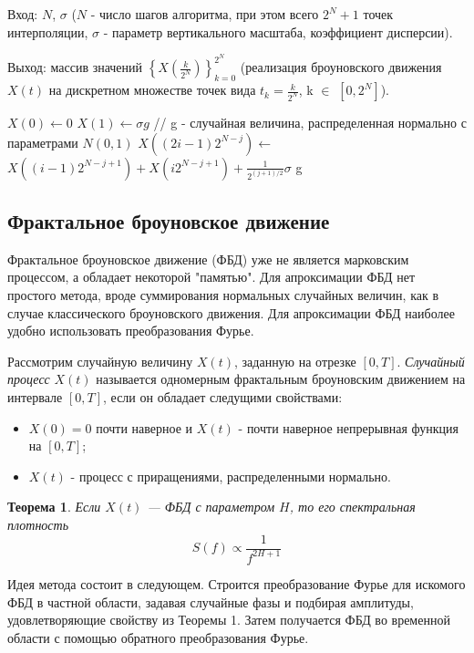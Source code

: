 Вход: $N$, 	$\sigma$ ($N$ - число шагов алгоритма, при этом всего $2^N + 1$ точек интерполяции, $\sigma$ - параметр вертикального масштаба, коэффициент дисперсии).

Выход: массив значений $\left\{X(\frac{k}{2^N})\right\}_{k=0}^{2^N}$ (реализация броуновского движения $X(t)$ на дискретном множестве точек вида $t_k = \frac{k}{2^N}$, k $\in$ $[0, 2^N]$).

\begin{algorithmic}[1]
	\State $X(0)\gets 0$
	\State $X(1)\gets \sigma g$ // g - случайная величина, распределенная нормально с параметрами $N(0,1)$
	\State $X((2i - 1) 2^{N - j})$$\gets$ $X((i - 1)2^{N-j+1}) + X(i2^{N - j + 1}) + \frac{1}{2^{(j+1)/2}}$$\sigma$ g
	\EndFor
	\EndFor
\end{algorithmic}

\subsection{Фрактальное броуновское движение}

Фрактальное броуновское движение (ФБД) уже не является марковским процессом, а обладает некоторой "памятью". Для апроксимации ФБД нет простого метода, вроде суммирования нормальных случайных величин, как в случае классического броуновского движения. Для апроксимации ФБД наиболее удобно использовать преобразования Фурье.

Рассмотрим случайную величину $X(t)$, заданную на отрезке $[0, T]$. \textit{Случайный процесс}  $X(t)$ называется одномерным фрактальным броуновским движением на интервале $[0, T]$, если он обладает следущими свойствами:

\begin{itemize}
	\item $X(0) = 0$ почти наверное и $X(t)$ - почти наверное непрерывная функция на $[0, T]$;
	\item  $X(t)$ - процесс с приращениями, распределенными нормально.
\end{itemize}

\newtheorem{theorem1}{Теорема}
\begin{theorem1}
	Если $X(t)$ --- ФБД с параметром $H$, то его спектральная плотность 
	\begin{equation}
		S(f) \propto \frac{1}{f^{2H+1}}
	\end{equation}
\end{theorem1}

Идея метода состоит в следующем. Строится преобразование Фурье для искомого ФБД в частной области, задавая случайные фазы и подбирая амплитуды, удовлетворяющие свойству из Теоремы 1. Затем получается ФБД во временной области с помощью обратного преобразования Фурье.

